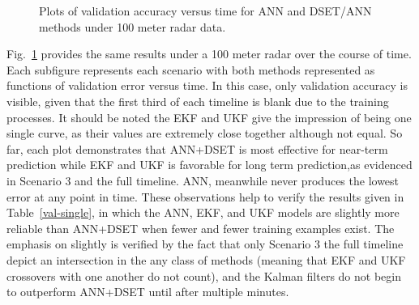 \documentclass[12pt]{uthesis-v12}  %
\begin{document}
\begin{figure}
	\hfill	
{}
						
\caption{Plots of validation accuracy versus time for ANN and DSET/ANN methods under 100 meter radar data.}
	\label{100-one}
	\end{figure}
	
Fig.~\ref{100-one} provides the same results under a 100 meter radar over the course of time. Each subfigure represents each scenario with both methods represented as functions of validation error versus time. In this case, only validation accuracy is visible, given that the first third of each timeline is blank due to the training processes. It should be noted the EKF and UKF give the impression of being one single curve, as their values are extremely close together although not equal. So far, each plot demonstrates that ANN+DSET is most effective for near-term prediction while EKF and UKF is favorable for long term prediction,as evidenced in Scenario 3 and the full timeline. ANN, meanwhile never produces the lowest error at any point in time. These observations help to verify the results given in Table~\ref{val-single}, in which the ANN, EKF, and UKF models are slightly more reliable than ANN+DSET when fewer and fewer training examples exist. The emphasis on slightly is verified by the fact that only Scenario 3 the full timeline depict an intersection in the any class of methods (meaning that EKF and UKF crossovers with one another do not count), and the Kalman filters do not begin to outperform ANN+DSET until after multiple minutes.	
	
\end{document}
